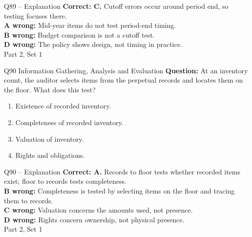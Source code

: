 \documentclass[aspectratio=169,10pt]{beamer}
\begin{document}
\begin{frame}[t]{Q89 -- Explanation}
	\footnotesize
	\textbf{Correct: C.} Cutoff errors occur around period end, so testing focuses there. \\[5pt]
\textbf{A wrong:} Mid-year items do not test period-end timing. \\[3pt]
\textbf{B wrong:} Budget comparison is not a cutoff test. \\[3pt]
\textbf{D wrong:} The policy shows design, not timing in practice. \\[3pt]
	\vfill {\tiny Part 2, Set 1}
\end{frame}
\begin{frame}[t]{Q90 \hfill {\scriptsize Information Gathering, Analysis and Evaluation}}
	\small
	\textbf{Question:} At an inventory count, the auditor selects items from the perpetual records and locates them on the floor. What does this test?
	\begin{enumerate}[label=\Alph*.,itemsep=1pt,topsep=3pt]
			\item Existence of recorded inventory.
			\item Completeness of recorded inventory.
			\item Valuation of inventory.
			\item Rights and obligations.
	\end{enumerate}
\end{frame}
\begin{frame}[t]{Q90 -- Explanation}
	\footnotesize
	\textbf{Correct: A.} Records to floor tests whether recorded items exist; floor to records tests completeness. \\[5pt]
\textbf{B wrong:} Completeness is tested by selecting items on the floor and tracing them to records. \\[3pt]
\textbf{C wrong:} Valuation concerns the amounts used, not presence. \\[3pt]
\textbf{D wrong:} Rights concern ownership, not physical presence. \\[3pt]
	\vfill {\tiny Part 2, Set 1}
\end{frame}
\end{document}
